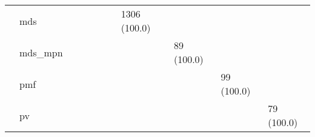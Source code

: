 \begin{tabular}{lllllllllll}
                 & mds &                      &                     &                    &                      &                     &      1306 (100.0) &                   &                     &                      \\
                 & mds\_mpn &                      &                     &                    &                      &                     &                   &        89 (100.0) &                     &                      \\
                 & pmf &                      &                     &                    &                      &                     &                   &                   &          99 (100.0) &                      \\
                 & pv &                      &                     &                    &                      &                     &                   &                   &                     &           79 (100.0) \\
\bottomrule
\end{tabular}
